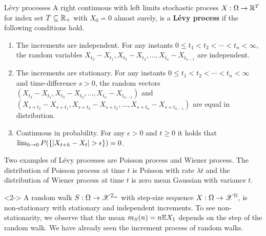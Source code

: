 \documentclass[12pt,aspectratio=169]{beamer}
\begin{document}
\begin{frame}{L\'evy processes}
A right continuous with left limits stochastic process $X:\Omega\to\mathbb{R}^T$ for index set $T \subseteq \mathbb{R}_+$ with $X_0 = 0$ almost surely, is a \textbf{L\'evy process} if the following conditions hold. 
\begin{enumerate}[(L1)]
\item<2-> The increments are independent. 
For any instants $ 0\le t_{1}<t_{2}<\cdots <t_{n}<\infty$, the random variables $X_{t_{2}}-X_{t_{1}},X_{t_{3}}-X_{t_{2}},\dots ,X_{t_{n}}-X_{t_{n-1}}$ are independent.
\item<3-> The increments are stationary. 
For any instants $0\le t_{1}<t_{2}<\cdots <t_{n}<\infty$ and time-difference $s > 0$, 
the random vectors $(X_{t_{2}}-X_{t_{1}},X_{t_{3}}-X_{t_{2}},\dots ,X_{t_{n}}-X_{t_{n-1}})$ and $(X_{s+t_{2}}-X_{s+t_{1}},X_{s+t_{3}}-X_{s+t_{2}},\dots ,X_{s+t_{n}}-X_{s+t_{n-1}})$ are equal in distribution. 
\item<4-> Continuous in probability. For any $\epsilon > 0$ and $t\ge 0$ it holds that $\lim _{h\to 0}P(\left\{\left\lvert X_{t+h}-X_{t}\right\rvert>\epsilon\right\})=0$. 
\end{enumerate}
\end{frame}


\begin{frame}
\begin{Example}
Two examples of L\'evy processes are Poisson process and Wiener process. 
The distribution of Poisson process at time $t$ is Poisson with rate $\lambda t$ and the distribution of Wiener process at time $t$ is zero mean Gaussian with variance $t$. 
\end{Example}

\begin{Example}<2->
A random walk $S:\Omega\to\mathscr{X}^{\mathbb{Z}_+}$ with \iid step-size sequence $X:\Omega\to\mathscr{X}^{\mathbb{N}}$, is non-stationary with stationary and independent increments. 
To see non-stationarity, we observe that the mean $m_S(n) = n \mathbb{E} X_1$ depends on the step of the random walk. 
We have already seen the increment process of random walks. 
\end{Example}
\end{frame}
\end{document}
